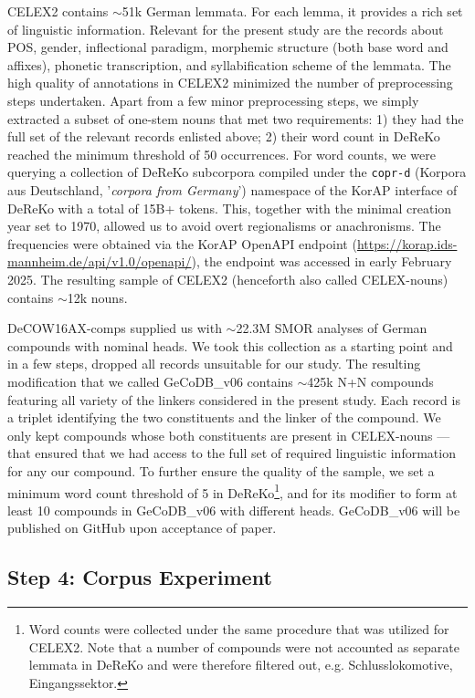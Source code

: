 \documentclass[10pt, a4paper]{article}
\begin{document}
CELEX2 contains $\sim$51k German lemmata. For each lemma, it provides a rich set of linguistic information. Relevant for the present study are the records about POS, gender, inflectional paradigm, morphemic structure (both base word and affixes), phonetic transcription, and syllabification scheme of the lemmata. The high quality of annotations in CELEX2 minimized the number of preprocessing steps undertaken. Apart from a few minor preprocessing steps, we simply extracted a subset of one-stem nouns that met two requirements: 1) they had the full set of the relevant records enlisted above; 2) their word count in DeReKo reached the minimum threshold of 50 occurrences. For word counts, we were querying a collection of DeReKo subcorpora compiled under the \texttt{copr-d} (Korpora aus Deutschland, '\textit{corpora from Germany}') namespace of the KorAP interface of DeReKo with a total of 15B+ tokens. This, together with the minimal creation year set to 1970, allowed us to avoid overt regionalisms or anachronisms. The frequencies were obtained via the KorAP OpenAPI endpoint (\url{https://korap.ids-mannheim.de/api/v1.0/openapi/}), the endpoint was accessed in early February 2025. The resulting sample of CELEX2 (henceforth also called CELEX-nouns) contains $\sim$12k nouns.

DeCOW16AX-comps supplied us with $\sim$22.3M SMOR \citep{schmid_2004} analyses of German compounds with nominal heads. We took this collection as a starting point and in a few steps, dropped all records unsuitable for our study. The resulting modification that we called GeCoDB\_v06 contains $\sim$425k N+N compounds featuring all variety of the linkers considered in the present study. Each record is a triplet identifying the two constituents and the linker of the compound. We only kept compounds whose both constituents are present in CELEX-nouns --- that ensured that we had access to the full set of required linguistic information for any our compound. To further ensure the quality of the sample, we set a minimum word count threshold of 5 in DeReKo\footnote{Word counts were collected under the same procedure that was utilized for CELEX2. Note that a number of compounds were not accounted as separate lemmata in DeReKo and were therefore filtered out, e.g. Schlusslokomotive, Eingangssektor.}, and for its modifier to form at least 10 compounds in GeCoDB\_v06 with different heads. GeCoDB\_v06 will be published on GitHub upon acceptance of paper.


\subsection{Step 4: Corpus Experiment}
\label{sec:exp}
\end{document}
